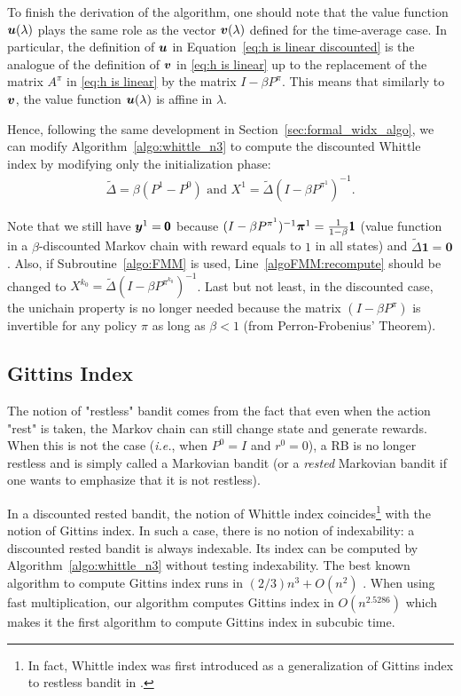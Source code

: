 \documentclass[acmsmall,screen,anonymous]{acmart}
\begin{document}
To finish the derivation of the algorithm, one should note that the value function $\boldsymbol{u}(\lambda)$ plays the same role as the vector $\boldsymbol{v}(\lambda)$ defined for the time-average case. In particular, the definition of $\boldsymbol{u}$ in Equation~\eqref{eq:h is linear discounted} is the analogue of the definition of $\boldsymbol{v}$ in \eqref{eq:h is linear} up to the replacement of the matrix $A^\pi$ in \eqref{eq:h is linear} by the matrix $I-\beta P^\pi$. This means that similarly to $\boldsymbol{v}$, the value function $\boldsymbol{u}(\lambda)$ is affine in $\lambda$.

Hence, following the same development in Section~\ref{sec:formal_widx_algo}, we can modify Algorithm~\ref{algo:whittle_n3} to compute the discounted Whittle index by modifying only the initialization phase:
\begin{align*}
    \tilde{\Delta}=\beta(P^1-P^0) \text{ and } X^1=\tilde{\Delta}(I-\beta P^{\pi^1})^{-1}.
\end{align*}

Note that we still have $\boldsymbol{y}^1=\pmb{0}$ because $(I-\beta P^{\pi^1})^{-1}\boldsymbol{\pi}^1=\frac1{1-\beta}\pmb{1}$ (value function in a $\beta$-discounted Markov chain with reward equals to $1$ in all states) and $\tilde{\Delta}\pmb{1}=\pmb{0}$. Also, if Subroutine~\ref{algo:FMM} is used, Line~\ref{algoFMM:recompute} should be changed to $X^{k_0}=\tilde{\Delta}(I-\beta P^{\pi^{k_0}})^{-1}$. Last but not least, in the discounted case, the unichain property is no longer needed because the matrix $(I-\beta P^\pi)$ is invertible for any policy $\pi$ as long as $\beta<1$ (from Perron-Frobenius' Theorem).


\subsection{Gittins Index}

The notion of "restless" bandit comes from the fact that even when the action "rest" is taken, the Markov chain can still change state and generate rewards. When this is not the case (\emph{i.e.}, when $P^0=I$ and $r^0=0$), a RB is no longer restless and is simply called a Markovian bandit (or a \emph{rested} Markovian bandit if one wants to emphasize that it is not restless).

In a discounted rested bandit, the notion of Whittle index coincides\footnote{In fact, Whittle index was first introduced as a generalization of Gittins index to restless bandit in \cite{whittle1988restless}.} with the notion of Gittins index. In such a case, there is no notion of indexability: a discounted rested bandit is always indexable. Its index can be computed by Algorithm~\ref{algo:whittle_n3} without testing indexability. The best known algorithm to compute Gittins index runs in $(2/3) n^3 +O(n^2)$ \cite{chakravortyMultiArmedBanditsGittins2014}. When using fast multiplication, our algorithm computes Gittins index in $O(n^{2.5286})$ which makes it the first algorithm to compute Gittins index in subcubic time.  
\end{document}
